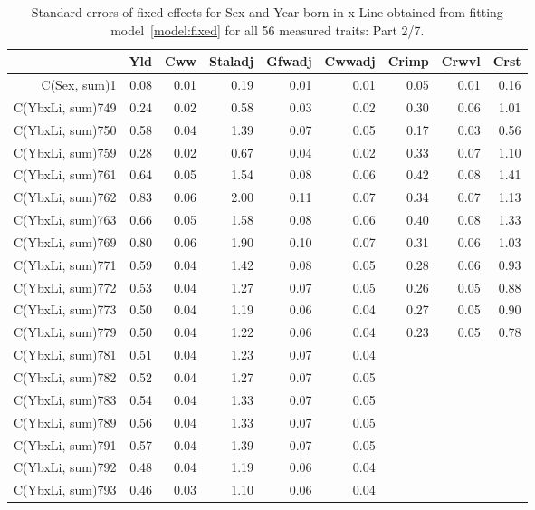 \begin{table}[p]
\centering
\caption{Standard errors of fixed effects for Sex and Year-born-in-x-Line obtained from fitting model~\ref{model:fixed} for all 56 measured traits: Part 2/7.}
\label{tab:seb2}
\begin{tabular}{rrrrrrrrr}
  \hline
 & Yld & Cww & Staladj & Gfwadj & Cwwadj & Crimp & Crwvl & Crst \\ 
  \hline
C(Sex, sum)1 & 0.08 & 0.01 & 0.19 & 0.01 & 0.01 & 0.05 & 0.01 & 0.16 \\ 
  C(YbxLi, sum)749 & 0.24 & 0.02 & 0.58 & 0.03 & 0.02 & 0.30 & 0.06 & 1.01 \\ 
  C(YbxLi, sum)750 & 0.58 & 0.04 & 1.39 & 0.07 & 0.05 & 0.17 & 0.03 & 0.56 \\ 
  C(YbxLi, sum)759 & 0.28 & 0.02 & 0.67 & 0.04 & 0.02 & 0.33 & 0.07 & 1.10 \\ 
  C(YbxLi, sum)761 & 0.64 & 0.05 & 1.54 & 0.08 & 0.06 & 0.42 & 0.08 & 1.41 \\ 
  C(YbxLi, sum)762 & 0.83 & 0.06 & 2.00 & 0.11 & 0.07 & 0.34 & 0.07 & 1.13 \\ 
  C(YbxLi, sum)763 & 0.66 & 0.05 & 1.58 & 0.08 & 0.06 & 0.40 & 0.08 & 1.33 \\ 
  C(YbxLi, sum)769 & 0.80 & 0.06 & 1.90 & 0.10 & 0.07 & 0.31 & 0.06 & 1.03 \\ 
  C(YbxLi, sum)771 & 0.59 & 0.04 & 1.42 & 0.08 & 0.05 & 0.28 & 0.06 & 0.93 \\ 
  C(YbxLi, sum)772 & 0.53 & 0.04 & 1.27 & 0.07 & 0.05 & 0.26 & 0.05 & 0.88 \\ 
  C(YbxLi, sum)773 & 0.50 & 0.04 & 1.19 & 0.06 & 0.04 & 0.27 & 0.05 & 0.90 \\ 
  C(YbxLi, sum)779 & 0.50 & 0.04 & 1.22 & 0.06 & 0.04 & 0.23 & 0.05 & 0.78 \\ 
  C(YbxLi, sum)781 & 0.51 & 0.04 & 1.23 & 0.07 & 0.04 &  &  &  \\ 
  C(YbxLi, sum)782 & 0.52 & 0.04 & 1.27 & 0.07 & 0.05 &  &  &  \\ 
  C(YbxLi, sum)783 & 0.54 & 0.04 & 1.33 & 0.07 & 0.05 &  &  &  \\ 
  C(YbxLi, sum)789 & 0.56 & 0.04 & 1.33 & 0.07 & 0.05 &  &  &  \\ 
  C(YbxLi, sum)791 & 0.57 & 0.04 & 1.39 & 0.07 & 0.05 &  &  &  \\ 
  C(YbxLi, sum)792 & 0.48 & 0.04 & 1.19 & 0.06 & 0.04 &  &  &  \\ 
  C(YbxLi, sum)793 & 0.46 & 0.03 & 1.10 & 0.06 & 0.04 &  &  &  \\ 

\end{tabular}
\end{table}
